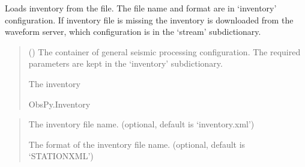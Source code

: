 \documentclass[letterpaper,10pt,english]{sphinxmanual}
\begin{document}

\begin{fulllineitems}
\label{\detokenize{api_core:core.signal_utils.load_inventory}}
\pysigstartsignatures
{}
\pysigstopsignatures
\sphinxAtStartPar
Loads inventory from the file. The file name and format are in ‘inventory’ configuration.
If inventory file is missing the inventory is downloaded from the waveform server,
which configuration is in the ‘stream’ sub\sphinxhyphen{}dictionary.
\begin{quote}\begin{description}
\sphinxAtStartPar
{} () \textendash{} The container of general seismic processing configuration.
The required parameters are kept in the ‘inventory’ sub\sphinxhyphen{}dictionary.

\sphinxAtStartPar
The inventory

\sphinxAtStartPar
ObsPy.Inventory

\end{description}\end{quote}

\sphinxAtStartPar
{}
\begin{quote}\begin{description}
\sphinxAtStartPar
The inventory file name. (optional, default is ‘inventory.xml’)

\sphinxAtStartPar
The format of the inventory file name. (optional, default is ‘STATIONXML’)

\end{description}\end{quote}

\end{fulllineitems}

\end{document}
